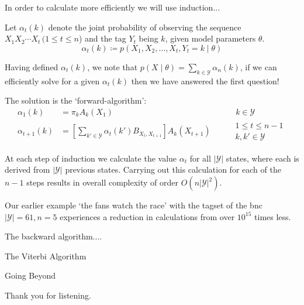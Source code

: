 \documentclass[envcountsect]{beamer}
\begin{document}
\begin{frame}
    In order to calculate more efficiently we will use induction...
    \begin{definition}
        Let $\alpha_t(k)$ denote the joint probability of observing the sequence $X_1 X_2 \cdots X_t \, (1 \leq t \leq n$) and the tag $Y_t$ being $k$, given model parameters $\theta$.
        \begin{equation*}
            \alpha_t(k) \coloneqq p(X_1,X_2,\ldots,X_t,Y_t=k \mid \theta)
        \end{equation*}
    \end{definition}

Having defined $\alpha_t(k)$, we note that $p(X \mid \theta) = \sum_{k \in \mathcal{Y}} \alpha_n(k)$, if we can efficiently solve for a given $\alpha_t(k)$ then we have answered the first question!

The solution is the `forward-algorithm':
\begin{align*}
    \alpha_1(k) &= \pi_{k} A_k(X_1) & \quad & \:\: k \in \mathcal{Y} \\
    \alpha_{t+1}(k) &= \left[ \sum_{k' \in \mathcal{Y}} \alpha_{t}(k')B_{X_t,X_{t+1}} \right] A_k(X_{t+1}) & \quad &
        \begin{array}{lr}
            1 \leq t \leq n-1\\
            k, k' \in \mathcal{Y}
        \end{array}
\end{align*}
    
\end{frame}

\begin{frame}
    At each step of induction we calculate the value $\alpha_t$ for all $|\mathcal{Y}|$ states, where each is derived from $|\mathcal{Y}|$ previous states.
Carrying out this calculation for each of the $n-1$ steps results in overall complexity of order $O(n|\mathcal{Y}|^2)$.

Our earlier example `the fans watch the race' with the tagset of the bnc $|\mathcal{Y}|=61,n=5$ experiences a reduction in calculations from over $10^{15}$ times less.

The backward algorithm....


\end{frame}

\begin{frame}{The Viterbi Algorithm}
    
\end{frame}

\begin{frame}{Going Beyond}
    
\end{frame}

\begin{frame}
\begin{center}
    \huge Thank you for listening.
\end{center}
\end{frame}
\end{document}
